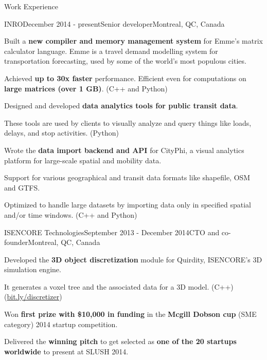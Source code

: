 \documentclass{resume} %
\begin{document}
\begin{rSection}{Work Experience}

\begin{rSubsection}{INRO}{December 2014 - present}{Senior developer}{Montreal,
        QC, Canada}
\item Built a \textbf{new compiler and memory management system} for Emme's
        matrix calculator language. Emme is a travel demand modelling system
        for transportation forecasting, used by some of the world's most
        populous cities.
\begin{lsubSubsection} 
\item Achieved \textbf{up to 30x faster} performance. Efficient even for
        computations on \textbf{large matrices (over 1 GB)}. (C++ and Python)
\end{lsubSubsection}
\item Designed and developed \textbf{data analytics tools for public transit
        data}.
\begin{lsubSubsection}
\item These tools are used by clients to visually analyze and query things like
        loads, delays, and stop activities. (Python)
\end{lsubSubsection}
\item Wrote the \textbf{data import backend and API} for CityPhi, a
        visual analytics platform for large-scale spatial and mobility data.
\begin{lsubSubsection}
\item Support for various geographical and transit data formats like shapefile,
        OSM and GTFS.
\item Optimized to handle large datasets by importing data only in specified
        spatial and/or time windows. (C++ and Python)
\end{lsubSubsection}
\end{rSubsection}

\begin{rSubsection}{ISENCORE Technologies}{September 2013 - December 2014}{CTO
        and co-founder}{Montreal, QC, Canada}
\item Developed the \textbf{3D object discretization} module for
        Quirdity, ISENCORE's 3D simulation engine. 
\begin{lsubSubsection}
\item It generates a voxel tree and the associated data for a 3D model.
        (C++)(\href{http://bit.ly/discretizer}{bit.ly/discretizer})
\end{lsubSubsection}
\item Won \textbf{first prize with \$10,000 in funding} in the \textbf{Mcgill
        Dobson cup} (SME category) 2014 startup competition. 
\item Delivered the \textbf{winning pitch} to get selected as \textbf{one of
        the 20 startups worldwide} to present at SLUSH 2014.
\end{rSubsection}


\end{rSection}
\end{document}
